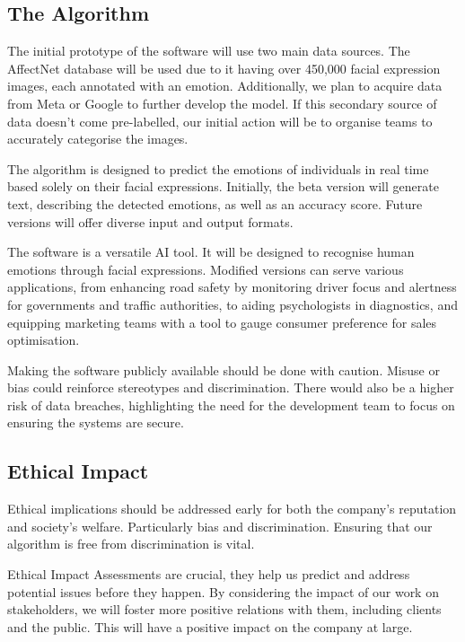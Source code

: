 \documentclass[10pt,journal,compsoc]{IEEEtran}
\begin{document}
\subsection{The Algorithm}
The initial prototype of the software will use two main data sources. The AffectNet database will be used due to it having over 450,000 facial expression images, each annotated with an emotion\cite{DatabasePaper}. Additionally, we plan to acquire data from Meta or Google to further develop the model. If this secondary source of data doesn’t come pre-labelled, our initial action will be to organise teams to accurately categorise the images.

The algorithm is designed to predict the emotions of individuals in real time based solely on their facial expressions. Initially, the beta version will generate text, describing the detected emotions, as well as an accuracy score. Future versions will offer diverse input and output formats.

The software is a versatile AI tool. It will be designed to recognise human emotions through facial expressions. Modified versions can serve various applications, from enhancing road safety by monitoring driver focus and alertness for governments and traffic authorities, to aiding psychologists in diagnostics, and equipping marketing teams with a tool to gauge consumer preference for sales optimisation. 

Making the software publicly available should be done with caution. Misuse or bias could reinforce stereotypes and discrimination. There would also be a higher risk of data breaches, highlighting the need for the development team to focus on ensuring the systems are secure.

\subsection{Ethical Impact}
Ethical implications should be addressed early for both the company’s reputation and society’s welfare. Particularly bias and discrimination. Ensuring that our algorithm is free from discrimination is vital.

Ethical Impact Assessments are crucial, they help us predict and address potential issues before they happen. By considering the impact of our work on stakeholders, we will foster more positive relations with them, including clients and the public. This will have a positive impact on the company at large.
\end{document}
